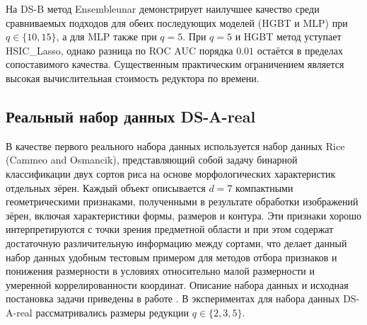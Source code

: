 \documentclass[12pt,a4paper]{article}
\begin{document}
\begin{table}[H]
\caption{Результаты на DS-B (MLP, $q=15$)}
\label{tab:exp:DSB:MLP:q15}
\centering\small
{}
\end{table}

На DS-B метод Ensembleunar демонстрирует наилучшее качество среди сравниваемых подходов
для обеих последующих моделей (HGBT и MLP) при $q\in\{10,15\}$, а для MLP также при $q=5$.
При $q=5$ и HGBT метод уступает HSIC\_Lasso, однако разница по ROC AUC порядка $0.01$ остаётся в пределах сопоставимого качества.
Существенным практическим ограничением является высокая вычислительная стоимость редуктора по времени.

\subsection{Реальный набор данных DS-A-real}

В качестве первого реального набора данных используется набор данных Rice (Cammeo and Osmancik),
представляющий собой задачу бинарной классификации двух сортов риса на основе морфологических
характеристик отдельных зёрен. Каждый объект описывается $d=7$ компактными геометрическими
признаками, полученными в результате обработки изображений зёрен, включая характеристики формы,
размеров и контура. Эти признаки хорошо интерпретируются с точки зрения предметной области и при
этом содержат достаточную различительную информацию между сортами, что делает данный набор данных
удобным тестовым примером для методов отбора признаков и понижения размерности в условиях
относительно малой размерности и умеренной коррелированности координат. Описание набора данных
и исходная постановка задачи приведены в работе \cite{uci_rice_2019}.
В экспериментах для набора данных DS-A-real рассматривались размеры редукции $q\in\{2,3,5\}$.
\end{document}
